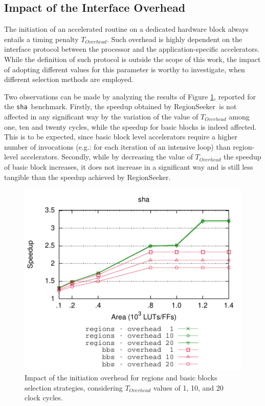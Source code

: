 \documentclass[]{usiinfthesis}
\newcommand{\rseeker}{{RegionSeeker}}
\newcommand{\sha}{\texttt{sha}}
\begin{document}
\subsection{Impact of the Interface Overhead}
\label{subsec:res_overhead}

The initiation of an accelerated routine on a dedicated hardware block
always entails a timing penalty $T_{Overhead}$.  Such overhead is
highly dependent on the interface protocol between the processor and
the application-specific accelerators. While the definition of such
protocol is outside the scope of this work, the
impact of adopting different values for this parameter is worthy to investigate, 
when different selection methods are employed.\par

Two observations can be made by analyzing the results of Figure
\ref{fig:overhead}, reported for the \sha\ benchmark. Firstly, the speedup 
obtained by \rseeker\ is not
affected in any significant way by the variation of the value of
$T_{Overhead}$ among one, ten and twenty cycles, while the speedup for
basic blocks is indeed affected. This is to be expected, since basic
block level accelerators require a higher number of invocations (e.g.:
for each iteration of an intensive loop) than region-level
accelerators. Secondly, while by decreasing the value of
$T_{Overhead}$ the speedup of basic block increases, it does not
increase in a significant way and is still %
less tangible than the speedup achieved by \rseeker.

\begin{figure}[h]
\centering
\includegraphics[width=0.6 \linewidth]
{figs/overhead_sha}
\caption{Impact of the initiation overhead for regions and basic
  blocks selection strategies, considering $T_{Overhead}$ values of 1,
  10, and 20 clock cycles.}
\label{fig:overhead}
\end{figure}
\end{document}
